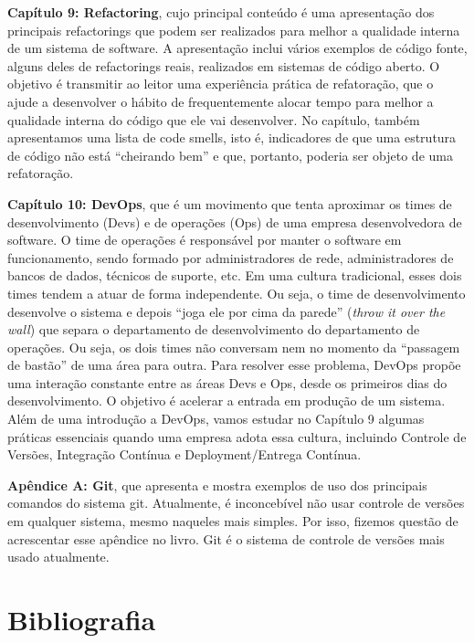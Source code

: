 \documentclass[
  11pt,
  twoside]{book}
\begin{document}
\textbf{Capítulo 9: Refactoring}, cujo principal conteúdo é uma
apresentação dos principais refactorings que podem ser realizados para
melhor a qualidade interna de um sistema de software. A apresentação
inclui vários exemplos de código fonte, alguns deles de refactorings
reais, realizados em sistemas de código aberto. O objetivo é transmitir
ao leitor uma experiência prática de refatoração, que o ajude a
desenvolver o hábito de frequentemente alocar tempo para melhor a
qualidade interna do código que ele vai desenvolver. No capítulo, também
apresentamos uma lista de code smells, isto é, indicadores de que uma
estrutura de código não está ``cheirando bem'' e que, portanto, poderia
ser objeto de uma refatoração.

\textbf{Capítulo 10: DevOps}, que é um movimento que tenta aproximar os
times de desenvolvimento (Devs) e de operações (Ops) de uma empresa
desenvolvedora de software. O time de operações é responsável por manter
o software em funcionamento, sendo formado por administradores de rede,
administradores de bancos de dados, técnicos de suporte, etc. Em uma
cultura tradicional, esses dois times tendem a atuar de forma
independente. Ou seja, o time de desenvolvimento desenvolve o sistema e
depois ``joga ele por cima da parede'' (\emph{throw it over the wall})
que separa o departamento de desenvolvimento do departamento de
operações. Ou seja, os dois times não conversam nem no momento da
``passagem de bastão'' de uma área para outra. Para resolver esse
problema, DevOps propõe uma interação constante entre as áreas Devs e
Ops, desde os primeiros dias do desenvolvimento. O objetivo é acelerar a
entrada em produção de um sistema. Além de uma introdução a DevOps,
vamos estudar no Capítulo 9 algumas práticas essenciais quando uma
empresa adota essa cultura, incluindo Controle de Versões, Integração
Contínua e Deployment/Entrega Contínua.

\textbf{Apêndice A: Git}, que apresenta e mostra exemplos de uso dos
principais comandos do sistema git. Atualmente, é inconcebível não usar
controle de versões em qualquer sistema, mesmo naqueles mais simples.
Por isso, fizemos questão de acrescentar esse apêndice no livro. Git é o
sistema de controle de versões mais usado atualmente.

\hypertarget{bibliografia}{%
\section*{Bibliografia}\label{bibliografia}}
\end{document}
